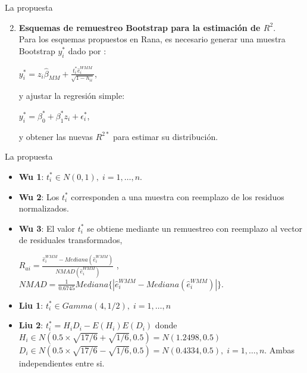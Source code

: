 \documentclass[serif, aspectratio=169]{beamer}
\begin{document}
\begin{frame}{La propuesta}
	
	\begin{enumerate}
		\setcounter{enumi}{1}
		\item {\large \textbf{Esquemas de remuestreo Bootstrap para la estimación de $R^{2}$}.}\\
		
		Para los esquemas propuestos en Rana, es necesario generar una muestra Bootstrap $y^{*}_{i}$ dado por :
		
		\begin{center}
			{\large$y^{*}_{i} =z_{i}\hat{\beta}_{MM} + \frac{t^{*}_{i}\hat{e}^{WMM}_{i}}{\sqrt{1-h_{ii}}} $},
		\end{center}
		
		y ajustar la regresión simple:
		 \begin{center}
		 	$y^{*}_{i} = \beta_0^{*} + \beta_1^{*} z_i + \epsilon_i^{*} $,
		 \end{center}
		 
		 y obtener las nuevas $R^{2*}$ para estimar su distribución.
		
	\end{enumerate}
	
\end{frame}

\begin{frame}{La propuesta}
	
	\begin{itemize}
		\item \textbf{Wu 1}: $t^{*}_{i} \in N(0,1) , \; i= 1,\dots ,n$.
		
		\item \textbf{Wu 2}: Los $t^{*}_{i}$ corresponden a una muestra con reemplazo de los residuos normalizados.
		
		\item\textbf{ Wu 3}: El valor $t^{*}_{i}$ se obtiene mediante un remuestreo con reemplazo al vector de residuales transformados,
		
		\begin{center}
			{\large $R_{ai} = \frac{\hat{e}^{WMM}_{i} - Mediana(\hat{e}^{WMM}_{i})}{ NMAD(\hat{e}^{WMM}_{i})  }$} , $NMAD = \frac{1}{0.6745} Mediana\{ | \hat{e}^{WMM}_{i} - Mediana(\hat{e}^{WMM}_{i}) | \}$.
		\end{center}
		\vspace{0.2cm}
		
		\item \textbf{Liu 1}: $ t^{*}_{i} \in Gamma(4, 1/2),\; i= 1,\dots ,n$
	
		\item \textbf{Liu 2}: $t^{*}_{i} = H_{i}D_{i}- E(H_{i})E(D_{i}) $ donde \\
		
		$H_{i} \in N( 0.5\times \sqrt{17/6} + \sqrt{1/6} ,  0.5) = N(1.2498, 0.5) $ \\
		$D_{i} \in N( 0.5 \times \sqrt{17/6} - \sqrt{1/6} ,  0.5) = N(0.4334, 0.5), \; i= 1,\dots ,n$. Ambas independientes entre si.
		
	\end{itemize}
	
\end{frame}
\end{document}
